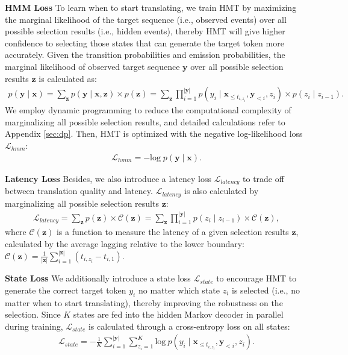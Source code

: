 \documentclass{article} %
\begin{document}
\textbf{HMM Loss} To learn when to start translating, we train HMT by maximizing the marginal likelihood of the target sequence (i.e., observed events) over all possible selection results (i.e., hidden events), thereby HMT will give higher confidence to selecting those states that can generate the target token more accurately. Given the transition probabilities and emission probabilities, the marginal likelihood of observed target sequence $\mathbf{y}$ over all possible selection results $\mathbf{z}$ is calculated as:
\begin{gather}
    p\!\left ( \mathbf{y}\mid \mathbf{x} \right )=\sum_{\mathbf{z}}p\!\left ( \mathbf{y}\mid \mathbf{x},\mathbf{z} \right ) \times p\!\left ( \mathbf{z} \right ) =\sum_{\mathbf{z}}\prod_{i=1}^{\left| \mathbf{y}\right|}p\!\left (y_{i}\mid \mathbf{x}_{\leq t_{i,z_{i}}},\mathbf{y}_{<i},z_{i}  \right )\times p\!\left ( z_{i}\mid z_{i-1}  \right ). \label{eq: hmm}
\end{gather}
We employ dynamic programming to reduce the computational complexity of marginalizing all possible selection results, and detailed calculations refer to Appendix \ref{sec:dp}.
Then, HMT is optimized with the negative log-likelihood loss $\mathcal{L}_{hmm}$:
\begin{gather}
    \mathcal{L}_{hmm}=-\mathrm{log}\; p\!\left ( \mathbf{y}\mid \mathbf{x} \right ).
\end{gather}

\textbf{Latency Loss} Besides, we also introduce a latency loss $\mathcal{L}_{latency}$ to trade off between translation quality and latency. $\mathcal{L}_{latency}$ is also calculated by marginalizing all possible selection results $\mathbf{z}$:
\begin{gather}
    \mathcal{L}_{latency}= \sum _{\mathbf{z}} p\!\left ( \mathbf{z}  \right )\times \mathcal{C}\!\left(\mathbf{z}\right)
    =\sum _{\mathbf{z}} \prod_{i=1}^{\left| \mathbf{y}\right|} p\!\left ( z_{i}\mid z_{i-1}  \right )\times \mathcal{C}\!\left(\mathbf{z}\right),
\end{gather}
\vspace{-0.9mm}where $\mathcal{C}\!\left(\mathbf{z}\right)$ is a function to measure the latency of a given selection results $\mathbf{z}$, calculated by the average lagging \citep{ma-etal-2019-stacl} relative to the lower boundary: $\mathcal{C}\!\left(\mathbf{z}\right)=\frac{1}{\left|\mathbf{z} \right|}  \sum _{i=1}^{\left|\mathbf{z} \right|} \left ( t_{i,z_i}-t_{i,1} \right )$.


\textbf{State Loss} We additionally introduce a state loss $\mathcal{L}_{state}$ to encourage HMT to generate the correct target token $y_{i}$ no matter which state $z_{i}$ is selected (i.e., no matter when to start translating), thereby improving the robustness on the selection. Since $K$ states are fed into the hidden Markov decoder in parallel during training, $\mathcal{L}_{state}$ is calculated through a cross-entropy loss on all states:
\begin{gather}
    \mathcal{L}_{state}=- \frac{1}{K} \sum_{i=1}^{\left| \mathbf{y}\right|}\sum_{z_{i}=1}^{K}\mathrm{log}\:p\!\left (y_{i}\mid \mathbf{x}_{\leq t_{i,z_{i}}},\mathbf{y}_{<i},z_{i} \right ).
\end{gather}
\end{document}
